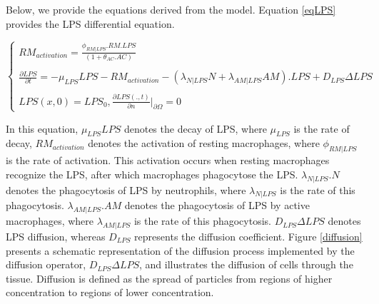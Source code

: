 \documentclass[10pt]{bmc_article}
\newenvironment{bmcformat}{\baselineskip20pt\sloppy\setboolean{publ}{false}}{\baselineskip20pt\sloppy}
\begin{document}
\begin{bmcformat}


Below, we provide the equations derived from the model. Equation \ref{eqLPS} provides the LPS differential equation.

\begin{equation}
 \begin{cases} 
  RM_{activation} = \frac{\phi_{RM|LPS}.RM.LPS}{(1 + \theta_{AC}.AC)}\\ \\
  \frac{\partial LPS}{\partial t} = -\mu_{LPS} LPS - RM_{activation} -(\lambda_{N|LPS}N + \lambda_{AM|LPS}AM).LPS + D_{LPS}\Delta LPS  \\\\
  LPS(x,0) = LPS_0,\frac{\partial LPS(.,t)}{\partial n} |_{\partial\Omega} = 0 
\end{cases} 
\label{eqLPS}
\end{equation}

In this equation, $\mu_{LPS} LPS$ denotes the decay of LPS, where $\mu_{LPS}$ is the rate of decay, $RM_{activation}$ denotes 
the activation of resting macrophages, where $\phi_{RM|LPS}$ is the rate of activation. This activation occurs when resting macrophages 
recognize the LPS, after which macrophages phagocytose the LPS. $\lambda_{N|LPS}.N$ denotes the phagocytosis of LPS by neutrophils, 
where $\lambda_{N|LPS}$ is the rate of this phagocytosis. $\lambda_{AM|LPS}.AM$ denotes the phagocytosis of LPS by active macrophages, 
where  $\lambda_{AM|LPS}$ is the rate of this phagocytosis. $D_{LPS}\Delta LPS$ denotes LPS diffusion, whereas $D_{LPS}$ represents the 
diffusion coefficient. Figure \ref{diffusion} presents a schematic representation of the diffusion process implemented by the diffusion 
operator, $D_{LPS}\Delta LPS$, and illustrates the diffusion of cells through the tissue. Diffusion is defined as the spread of particles 
from regions of higher concentration to regions of lower concentration. 



\end{bmcformat}
\end{document}
